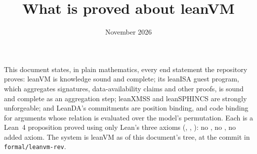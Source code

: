 \documentclass[11pt]{article}
\title{What is proved about leanVM}
\author{}
\date{November 2026}
\begin{document}
\maketitle

\noindent This document states, in plain mathematics, every end statement the repository proves:
leanVM is knowledge sound and complete; its leanISA guest program, which aggregates signatures,
data-availability claims and other proofs, is sound and complete as an aggregation step; leanXMSS
and leanSPHINCS are strongly unforgeable; and LeanDA's commitments are position binding, and code
binding for arguments whose relation is evaluated over the model's permutation. Each is a Lean~4
proposition proved using only Lean's three axioms (, ,
): no , no , no added axiom. The system is
leanVM as of this document's tree, at the commit in \texttt{formal/leanvm-rev}.
\end{document}

